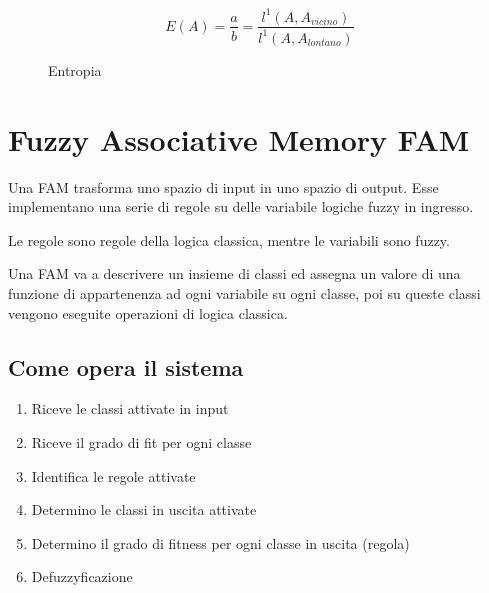 \documentclass[\main/main.tex]{subfiles}
\begin{document}
\begin{figure}[H]
	\[
	E(A) = \dfrac{a}{b} = \dfrac{l^1(A, A_{vicino})}{l^1(A, A_{lontano})}
	\]
	\caption{Entropia}
\end{figure}

\section{Fuzzy Associative Memory FAM}
Una FAM trasforma uno spazio di input in uno spazio di output. Esse implementano una serie di regole su delle variabile logiche fuzzy in ingresso.

Le regole sono regole della logica classica, mentre le variabili sono fuzzy.

Una FAM va a descrivere un insieme di classi ed assegna un valore di una funzione di appartenenza ad ogni variabile su ogni classe, poi su queste classi vengono eseguite operazioni di logica classica.

\subsection{Come opera il sistema}

\begin{enumerate}
\item Riceve le classi attivate in input
\item Riceve il grado di fit per ogni classe
\item Identifica le regole attivate
\item Determino le classi in uscita attivate
\item Determino il grado di fitness per ogni classe in uscita (regola)
\item Defuzzyficazione
\end{enumerate}
\end{document}
